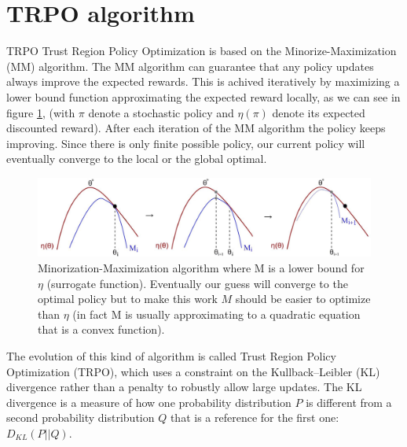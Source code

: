 \documentclass[11pt]{article}
\begin{document}
\section{TRPO algorithm}\label{section-trpo}
TRPO Trust Region Policy Optimization is based on the Minorize-Maximization (MM)
algorithm. The MM algorithm can guarantee that any policy updates always improve the
expected rewards. This is achived iteratively by maximizing a lower bound function
approximating the expected reward locally, as we can see in figure \ref{fig:functions1},
(with $\pi$ denote a stochastic policy and $\eta(\pi)$ denote its expected discounted
reward). After each iteration of the MM algorithm the policy keeps improving. Since there
is only finite possible policy, our current policy will eventually converge to the local
or the global optimal.
\begin{figure}[t]
        \includegraphics[width=15cm]{functions1}
        \centering
        \caption{Minorization-Maximization algorithm where M is a lower bound for $\eta$
        (surrogate function). Eventually our guess will converge to the optimal policy but
        to make this work $M$ should be easier to optimize than $\eta$ (in fact M is
        usually approximating to a quadratic equation that is a convex function). }
        \label{fig:functions1}
\end{figure}

The evolution of this kind of algorithm is called Trust Region Policy Optimization (TRPO),
which uses a constraint on the Kullback–Leibler (KL) divergence rather than a penalty to
robustly allow large updates. The KL divergence is a measure of how one probability
distribution $P$ is different from a second probability distribution $Q$ that is a
reference for the first one: $D_{KL}(P||Q)$.
\end{document}
